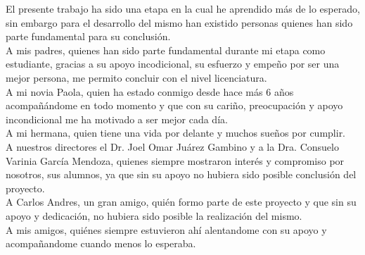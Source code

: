 \begin{tcolorbox}[adjusted title=flush center,halign title=flush center,titlerule=3mm,title= \large{Luis D. Meza M.}] 
El presente trabajo ha sido una etapa en la cual he aprendido más de lo esperado, sin embargo para el desarrollo del mismo han existido personas quienes han sido parte fundamental para su conclusión.
\\
A mis padres, quienes han sido parte fundamental durante mi etapa como estudiante, gracias a  su apoyo incodicional, su esfuerzo y empeño por ser una mejor persona, me permito concluir con el nivel licenciatura.
\\
A mi novia Paola, quien ha estado conmigo desde hace más 6 años acompañándome en todo momento y que con su cariño, preocupación y apoyo incondicional me ha motivado a ser mejor cada día. 
\\
A mi hermana, quien tiene una vida por delante y muchos sueños por cumplir.
\\
A nuestros directores el Dr. Joel Omar Juárez Gambino y a la Dra. Consuelo Varinia García Mendoza, quienes siempre mostraron interés y compromiso por nosotros, sus alumnos, ya que sin su apoyo no hubiera sido posible conclusión del proyecto.
\\
A Carlos Andres, un gran amigo, quién formo parte de este proyecto y que sin su apoyo y dedicación, no hubiera sido posible la realización del mismo.
\\
A mis amigos, quiénes siempre estuvieron ahí alentandome con su apoyo y acompañandome cuando menos lo esperaba.
\end{tcolorbox}


